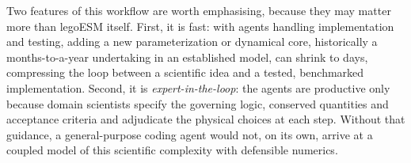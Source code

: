 \documentclass[11pt]{article}
\begin{document}
Two features of this workflow are worth emphasising, because they may matter more than legoESM
itself. First, it is fast: with agents handling implementation and testing, adding a new
parameterization or dynamical core, historically a months-to-a-year undertaking in an
established model, can shrink to days, compressing the loop between a scientific idea and a
tested, benchmarked implementation. Second, it is \emph{expert-in-the-loop}: the agents are
productive only because domain scientists specify the governing logic, conserved quantities and
acceptance criteria and adjudicate the physical choices at each step. Without that guidance, a
general-purpose coding agent would not, on its own, arrive at a coupled model of this scientific
complexity with defensible numerics.

\end{document}
